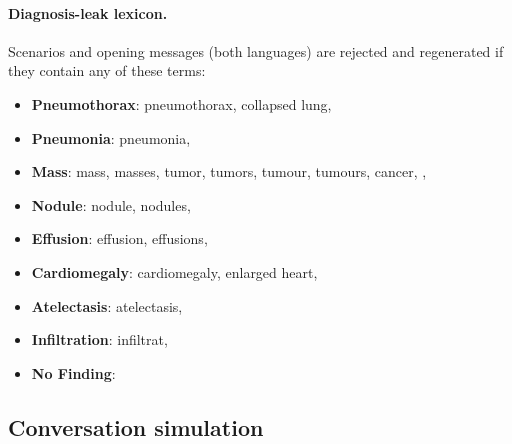 \paragraph{Diagnosis-leak lexicon.} Scenarios and opening messages (both languages) are rejected and regenerated if they contain any of these terms:

\begin{itemize}[leftmargin=*,itemsep=1pt]\item \textbf{Pneumothorax}: pneumothorax, collapsed lung, \item \textbf{Pneumonia}: pneumonia, \item \textbf{Mass}: mass, masses, tumor, tumors, tumour, tumours, cancer, , \item \textbf{Nodule}: nodule, nodules, \item \textbf{Effusion}: effusion, effusions, \item \textbf{Cardiomegaly}: cardiomegaly, enlarged heart, \item \textbf{Atelectasis}: atelectasis, \item \textbf{Infiltration}: infiltrat, \item \textbf{No Finding}: \end{itemize}

\subsection{Conversation simulation}\label{app:p:conv}

